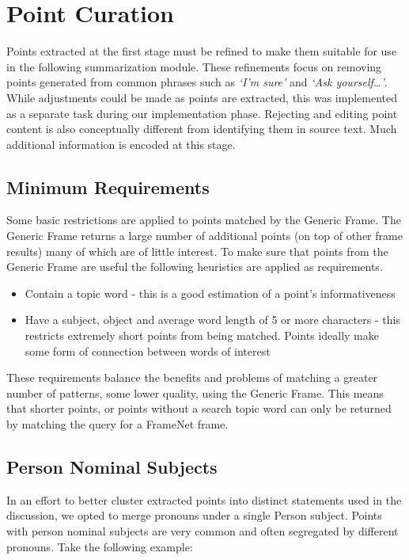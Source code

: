 \chapter{Point Curation\label{chap:point-curation}}
Points extracted at the first stage must be refined to make them suitable for use in the following summarization module. These refinements focus on removing points generated from common phrases such as \textit{`I'm sure'} and \textit{`Ask yourself\dots'}. While adjustments could be made as points are extracted, this was implemented as a separate task during our implementation phase. Rejecting and editing point content is also conceptually different from identifying them in source text. Much additional information is encoded at this stage.

  \section{Minimum Requirements}
    Some basic restrictions are applied to points matched by the Generic Frame. The Generic Frame returns a large number of additional points (on top of other frame results) many of which are of little interest. To make sure that points from the Generic Frame are useful the following heuristics are applied as requirements.

    \begin{itemize}
      \item{Contain a topic word - this is a good estimation of a point's informativeness}
      \item{Have a subject, object and average word length of 5 or more characters - this restricts extremely short points from being matched. Points ideally make some form of connection between words of interest}
    \end{itemize}

    These requirements balance the benefits and problems of matching a greater number of patterns, some lower quality, using the Generic Frame. This means that shorter points, or points without a search topic word can only be returned by matching the query for a FrameNet frame.

  \section{Person Nominal Subjects}
    In an effort to better cluster extracted points into distinct statements used in the discussion, we opted to merge pronouns under a single Person subject. Points with person nominal subjects are very common and often segregated by different pronouns. Take the following example:

